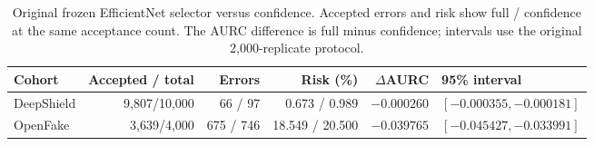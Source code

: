 \begin{table}[t]
\caption{Original frozen EfficientNet selector versus confidence. Accepted errors and risk show full / confidence at the same acceptance count. The AURC difference is full minus confidence; intervals use the original 2,000-replicate protocol.}
\label{tab:original}
\centering\small
\begin{tabular}{lrrrrl}
\toprule
Cohort & Accepted / total & Errors & Risk (\%) & $\Delta$AURC & 95\% interval \\
\midrule
DeepShield & 9,807/10,000 & 66 / 97 & 0.673 / 0.989 & $-0.000260$ & $[-0.000355, -0.000181]$ \\
OpenFake & 3,639/4,000 & 675 / 746 & 18.549 / 20.500 & $-0.039765$ & $[-0.045427, -0.033991]$ \\
\bottomrule
\end{tabular}
\end{table}
